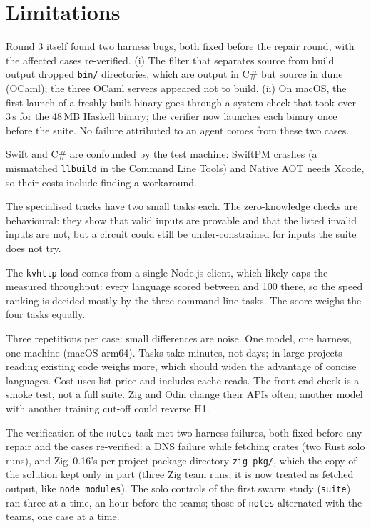 \documentclass[11pt,a4paper]{article}
\begin{document}
\section{Limitations}

Round 3 itself found two harness bugs, both fixed before the repair round, with the affected cases
re-verified. (i) The filter that separates source from build output dropped \texttt{bin/} directories,
which are output in C\# but source in dune (OCaml); the three OCaml servers appeared not to build.
(ii) On macOS, the first launch of a freshly built binary goes through a system check that took over
3\,s for the 48\,MB Haskell binary; the verifier now launches each binary once before the suite. No
failure attributed to an agent comes from these two cases.

Swift and C\# are confounded by the test machine: SwiftPM crashes (a mismatched \texttt{llbuild} in
the Command Line Tools) and Native AOT needs Xcode, so their costs include finding a workaround.

The specialised tracks have two small tasks each. The zero-knowledge checks are behavioural: they show
that valid inputs are provable and that the listed invalid inputs are not, but a circuit could still be
under-constrained for inputs the suite does not try.

The \texttt{kvhttp} load comes from a single Node.js client, which likely caps the measured throughput:
every language scored between \KvPointsMin{} and 100 there, so the speed ranking is decided mostly by the
three command-line tasks. The score weighs the four tasks equally.

Three repetitions per case: small differences are noise. One model, one harness, one machine (macOS
arm64). Tasks take minutes, not days; in large projects reading existing code weighs more, which should
widen the advantage of concise languages. Cost uses list price and includes cache reads. The front-end
check is a smoke test, not a full suite. Zig and Odin change their APIs often; another model with
another training cut-off could reverse H1.

The verification of the \texttt{notes} task met two harness failures, both fixed before any repair and the
cases re-verified: a DNS failure while fetching crates (two Rust solo runs), and Zig~0.16's per-project
package directory \texttt{zig-pkg/}, which the copy of the solution kept only in part (three Zig team runs;
it is now treated as fetched output, like \texttt{node\_modules}). The solo controls of the first swarm study
(\texttt{suite}) ran three at a time, an hour before the teams; those of \texttt{notes} alternated with the
teams, one case at a time.
\end{document}
